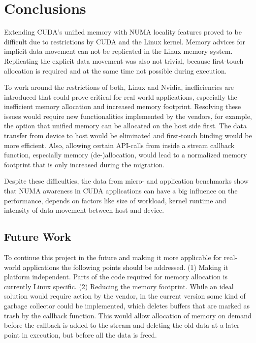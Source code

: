 \chapter{Conclusions}\label{c:conc}
Extending CUDA's unified memory with NUMA locality features proved to be difficult due to restrictions by CUDA and the Linux 
kernel. Memory advices for implicit data movement can not be replicated in the Linux memory system. Replicating the
explicit data movement was also not trivial, because first-touch allocation is required and at the same time not 
possible during execution.

To work around the restrictions of both, Linux and Nvidia, inefficiencies are introduced that could prove 
critical for real world applications, especially the inefficient memory allocation and increased memory
footprint. Resolving these issues would require new functionalities implemented by the vendors, for example, the option that
unified memory can be allocated on the host side first. The data transfer from device to host would be eliminated and
first-touch binding would be more efficient. Also, allowing certain API-calls from inside a stream callback function, especially memory
(de-)allocation, would lead to a normalized memory footprint that is only increased during the migration.

Despite these difficulties,  the data from micro- and application benchmarks 
show that NUMA awareness in CUDA applications can have a big influence on the performance, 
depends on factors like size of workload, kernel runtime and 
intensity of data movement between host and device. 


\section{Future Work}
To continue this project in the future and making it more applicable for real-world applications the following
points should be addressed. (1) Making it platform independent. Parts of the code required for memory allocation is currently Linux specific. (2) Reducing the memory footprint. While an ideal
solution would require action by the vendor, in the current version some kind of garbage collector could
be implemented, which deletes buffers that are marked as trash by the callback function. This would allow allocation of memory
on demand before the callback is added to the stream and deleting the old data at a later point in execution, but before all the data is freed.